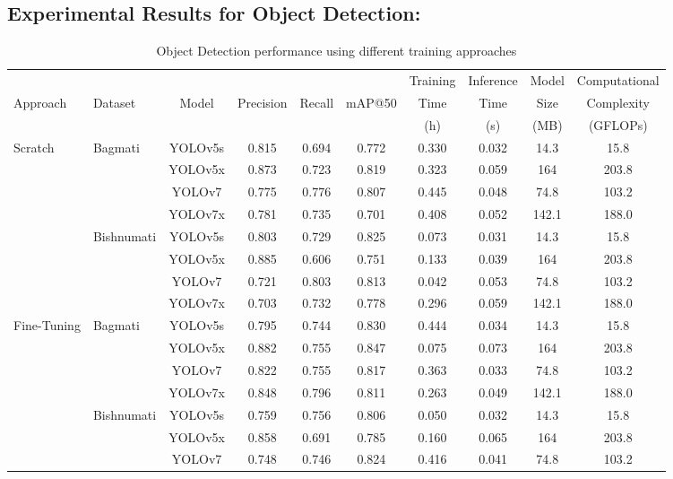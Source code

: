 \documentclass{ieeeaccess}
\begin{document}
\subsection{Experimental Results for Object Detection: }
\begin{table}[]
\centering
\caption{Object Detection performance using different training approaches}
\begin{tabular}{llcccccccc}
\hline
& & & & & &Training &  Inference & Model & Computational\\
Approach & Dataset & Model & Precision & Recall & mAP@50 & Time  & Time  & Size & Complexity\\
& & & & & & (h) &  (s) & (MB) & (GFLOPs)\\
\hline
\multirow{8}{*}{Scratch} & \multirow{4}{*}{Bagmati}  
& YOLOv5s & 0.815 & 0.694 & 0.772 & 0.330 & 0.032 & 14.3 &15.8 \\  
& & YOLOv5x & 0.873 & 0.723 & 0.819 & 0.323 & 0.059 & 164 & 203.8\\  
& & YOLOv7 & 0.775 & 0.776 & 0.807 & 0.445 & 0.048 & 74.8 & 103.2\\  
& & YOLOv7x & 0.781 & 0.735 & 0.701 & 0.408 &  0.052 & 142.1 & 188.0\\  
\cline{2-10}  
& \multirow{4}{*}{Bishnumati}  
& YOLOv5s & 0.803 & 0.729 & 0.825 & 0.073  & 0.031 & 14.3 &15.8 \\  
& & YOLOv5x & 0.885 & 0.606  & 0.751  & 0.133 &  0.039 & 164 & 203.8\\  
& & YOLOv7 & 0.721 & 0.803 & 0.813 & 0.042 & 0.053 & 74.8 & 103.2\\  
& & YOLOv7x & 0.703 & 0.732 & 0.778 & 0.296 &  0.059 &142.1 & 188.0\\  
\hline
\multirow{8}{*}{Fine-Tuning} & \multirow{4}{*}{Bagmati}  
& YOLOv5s & 0.795 & 0.744 & 0.830 & 0.444 &  0.034 & 14.3 &15.8 \\  
& & YOLOv5x & 0.882 & 0.755 & 0.847 & 0.075 &  0.073 & 164 & 203.8\\  
& & YOLOv7 & 0.822 & 0.755 & 0.817 & 0.363 &  0.033 & 74.8 & 103.2\\   
& & YOLOv7x & 0.848 & 0.796 & 0.811 & 0.263 & 0.049 &142.1 & 188.0\\  
\cline{2-10} 
& \multirow{4}{*}{Bishnumati}  
& YOLOv5s & 0.759 & 0.756  & 0.806 & 0.050 & 0.032  & 14.3 &15.8 \\  
& & YOLOv5x & 0.858 & 0.691  & 0.785 & 0.160 & 0.065 & 164 & 203.8\\  
& & YOLOv7 & 0.748 & 0.746 &0.824  &  0.416&  0.041 & 74.8 & 103.2\\  

\end{tabular}
\end{table}
\end{document}
